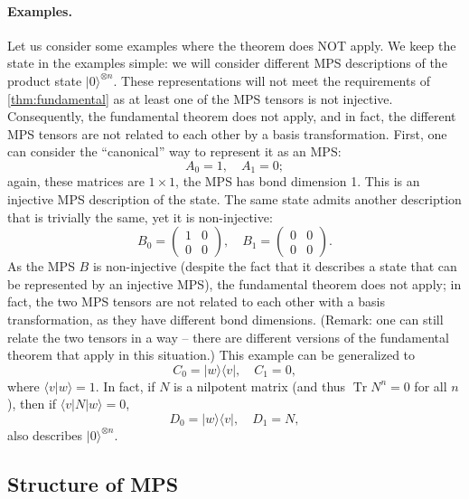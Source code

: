 \documentclass{article}
\newcommand{\tr}{\operatorname{Tr}}
\newcommand{\ket}[1]{\vert #1 \rangle}
\newcommand{\bra}[1]{\langle #1 \vert}
\newcommand{\scalprod}[2]{\langle #1 \vert #2 \rangle}
\begin{document}
\paragraph{Examples.} Let us consider some examples where the theorem does NOT apply. We keep the state in the examples simple: we will consider different MPS descriptions of the product state $\ket{0}^{\otimes n}$. These representations will not meet the requirements of \cref{thm:fundamental} as at least one of the MPS tensors is not injective. Consequently, the fundamental theorem does not apply, and in fact, the different MPS tensors are not related to each other by a basis transformation. First, one can consider the ``canonical'' way to represent it as an MPS:
\begin{equation*}
  A_0 = 1, \quad 
  A_1 = 0;
\end{equation*}
again, these matrices are $1\times 1$, the MPS has bond dimension 1. This is an injective MPS description of the state. The same state admits another description that is trivially the same, yet it is non-injective:
\begin{equation*}
  B_0 = \left(\begin{matrix}
    1 & 0 \\ 0 & 0 
  \end{matrix}\right), \quad 
  B_1 = \left(\begin{matrix}
    0 & 0 \\ 0 & 0 
  \end{matrix}\right).
\end{equation*}
As the MPS $B$ is non-injective (despite the fact that it describes a state that can be represented by an injective MPS), the fundamental theorem does not apply; in fact, the two MPS tensors are not related to each other with a basis transformation, as they have different bond dimensions. (Remark: one can still relate the two tensors in a way -- there are different versions of the fundamental theorem that apply in this situation.) This example can be generalized to 
\begin{equation*}
  C_0 = \ket{w}\bra{v}, \quad 
  C_1 = 0,
\end{equation*}
where $\scalprod{v}{w}=1$. In fact, if $N$ is a nilpotent matrix (and thus $\tr N^n = 0$ for all $n$), then if $\bra{v} N \ket{w} = 0$,  
\begin{equation*}
  D_0 = \ket{w}\bra{v}, \quad 
  D_1 = N,
\end{equation*}
also describes $\ket{0}^{\otimes n}$. 

\subsection{Structure of MPS}
\end{document}
